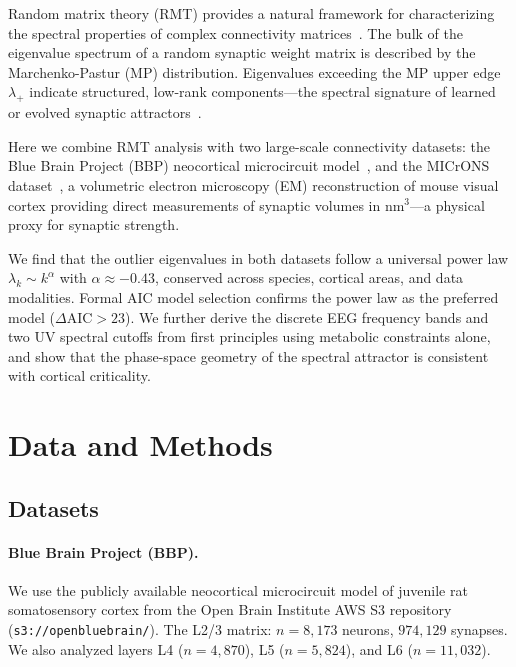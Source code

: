 \documentclass[aps,pre,twocolumn,showpacs,superscriptaddress,longbibliography]{revtex4-2}
\newcommand{\lp}{\lambda_{+}}
\begin{document}
Random matrix theory (RMT) provides a natural framework for characterizing
the spectral properties of complex connectivity matrices~\cite{Mehta2004}.
The bulk of the eigenvalue spectrum of a random synaptic weight matrix is
described by the Marchenko-Pastur (MP) distribution. Eigenvalues exceeding
the MP upper edge $\lp$ indicate structured, low-rank components---the
spectral signature of learned or evolved synaptic
attractors~\cite{Mastrogiuseppe2018}.

Here we combine RMT analysis with two large-scale connectivity datasets:
the Blue Brain Project (BBP) neocortical microcircuit model~\cite{Markram2015},
and the MICrONS dataset~\cite{MICrONS2021}, a volumetric electron microscopy
(EM) reconstruction of mouse visual cortex providing direct measurements
of synaptic volumes in nm$^3$---a physical proxy for synaptic strength.

We find that the outlier eigenvalues in both datasets follow a universal
power law $\lambda_k \sim k^\alpha$ with $\alpha \approx -0.43$,
conserved across species, cortical areas, and data modalities. Formal
AIC model selection confirms the power law as the preferred model
($\Delta\mathrm{AIC} > 23$). We further derive the discrete EEG
frequency bands and two UV spectral cutoffs from first principles
using metabolic constraints alone, and show that the phase-space
geometry of the spectral attractor is consistent with cortical
criticality.

\section{\label{sec:methods}Data and Methods}

\subsection{Datasets}

\paragraph{Blue Brain Project (BBP).}
We use the publicly available neocortical microcircuit model
of juvenile rat somatosensory cortex from the Open Brain Institute
AWS S3 repository (\texttt{s3://openbluebrain/}).
The L2/3 matrix: $n = 8{,}173$ neurons, $974{,}129$ synapses.
We also analyzed layers L4 ($n=4{,}870$), L5 ($n=5{,}824$),
and L6 ($n=11{,}032$).
\end{document}

